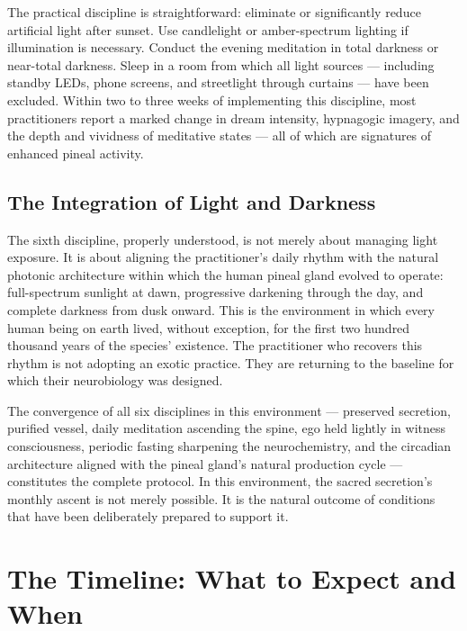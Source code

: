 \documentclass[12pt, a4paper]{article}
\begin{document}
The practical discipline is straightforward: eliminate or significantly reduce
artificial light after sunset. Use candlelight or amber-spectrum lighting if
illumination is necessary. Conduct the evening meditation in total darkness or
near-total darkness. Sleep in a room from which all light sources — including
standby LEDs, phone screens, and streetlight through curtains — have been
excluded. Within two to three weeks of implementing this discipline, most
practitioners report a marked change in dream intensity, hypnagogic imagery,
and the depth and vividness of meditative states — all of which are signatures
of enhanced pineal activity.

\subsection{The Integration of Light and Darkness}

The sixth discipline, properly understood, is not merely about managing light
exposure. It is about aligning the practitioner's daily rhythm with the natural
photonic architecture within which the human pineal gland evolved to operate:
full-spectrum sunlight at dawn, progressive darkening through the day, and
complete darkness from dusk onward. This is the environment in which every
human being on earth lived, without exception, for the first two hundred
thousand years of the species' existence. The practitioner who recovers this
rhythm is not adopting an exotic practice. They are returning to the baseline
for which their neurobiology was designed.

The convergence of all six disciplines in this environment — preserved
secretion, purified vessel, daily meditation ascending the spine, ego held
lightly in witness consciousness, periodic fasting sharpening the
neurochemistry, and the circadian architecture aligned with the pineal
gland's natural production cycle — constitutes the complete protocol. In this
environment, the sacred secretion's monthly ascent is not merely possible. It
is the natural outcome of conditions that have been deliberately prepared to
support it.

\section{The Timeline: What to Expect and When}
\label{sec:timeline}
\end{document}
